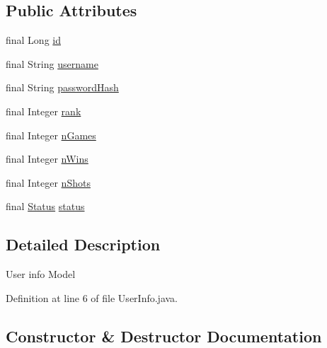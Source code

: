 \subsection*{Public Attributes}
\begin{DoxyCompactItemize}
\item 
final Long \hyperlink{classsharedlib_1_1tuples_1_1_user_info_a718f94d7bb86f3c19dd7ae911b4dfca3}{id}
\item 
final String \hyperlink{classsharedlib_1_1tuples_1_1_user_info_ae2aece1a833e9963fa7dc508992d4cf0}{username}
\item 
final String \hyperlink{classsharedlib_1_1tuples_1_1_user_info_ac680e59ba2bbe5e5c754977c393729da}{password\+Hash}
\item 
final Integer \hyperlink{classsharedlib_1_1tuples_1_1_user_info_acc55d52c1e93fbdc544907692ab5a45c}{rank}
\item 
final Integer \hyperlink{classsharedlib_1_1tuples_1_1_user_info_aed7cc749f766225615c61ae3d22063d9}{n\+Games}
\item 
final Integer \hyperlink{classsharedlib_1_1tuples_1_1_user_info_ab74910b9bc813f5090314372da220c04}{n\+Wins}
\item 
final Integer \hyperlink{classsharedlib_1_1tuples_1_1_user_info_aaafc1c84d64409331d72709349653130}{n\+Shots}
\item 
final \hyperlink{enumsharedlib_1_1tuples_1_1_user_info_1_1_status}{Status} \hyperlink{classsharedlib_1_1tuples_1_1_user_info_a2122f345a07ca469c305e79827797563}{status}
\end{DoxyCompactItemize}


\subsection{Detailed Description}
User info Model 

Definition at line 6 of file User\+Info.\+java.



\subsection{Constructor \& Destructor Documentation}
\hypertarget{classsharedlib_1_1tuples_1_1_user_info_a94efc532e161e878597b0dabe15fc945}{}\label{classsharedlib_1_1tuples_1_1_user_info_a94efc532e161e878597b0dabe15fc945} 
